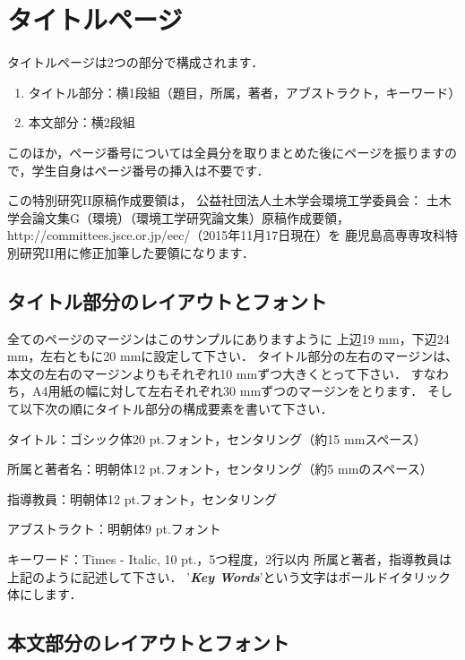 
\section{タイトルページ}

タイトルページは2つの部分で構成されます．

\begin{enumerate}
  \renewcommand{\labelenumi}{(\alph{enumi})}
  \item タイトル部分：横1段組（題目，所属，著者，アブストラクト，キーワード）
  \item 本文部分：横2段組
\end{enumerate}

このほか，ページ番号については全員分を取りまとめた後にページを振りますので，学生自身はページ番号の挿入は不要です．

この特別研究II原稿作成要領は，
公益社団法人土木学会環境工学委員会：
土木学会論文集G（環境）（環境工学研究論文集）原稿作成要領，
http://committees.jsce.or.jp/eec/（2015年11月17日現在）を
鹿児島高専専攻科特別研究II用に修正加筆した要領になります．

\subsection{タイトル部分のレイアウトとフォント}

全てのページのマージンはこのサンプルにありますように
上辺19 mm，下辺24 mm，左右ともに20 mmに設定して下さい．
タイトル部分の左右のマージンは、
本文の左右のマージンよりもそれぞれ10 mmずつ大きくとって下さい．
すなわち，A4用紙の幅に対して左右それぞれ30 mmずつのマージンをとります．
そして以下次の順にタイトル部分の構成要素を書いて下さい．

タイトル：ゴシック体20  pt.フォント，センタリング（約15 mmスペース）

所属と著者名：明朝体12 pt.フォント，センタリング（約5 mmのスペース）

指導教員：明朝体12 pt.フォント，センタリング

アブストラクト：明朝体9 pt.フォント

キーワード：Times - Italic, 10 pt.，5つ程度，2行以内
所属と著者，指導教員は上記のように記述して下さい．
'\textit{\textbf{Key Words}}'という文字はボールドイタリック体にします．

\subsection{本文部分のレイアウトとフォント}

